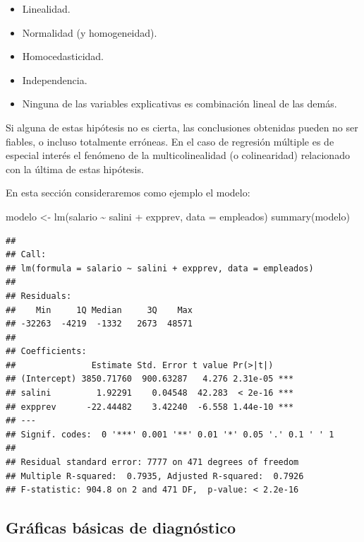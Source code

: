 \documentclass[
]{book}
\newenvironment{Shaded}{\begin{snugshade}}{\end{snugshade}}
\newcommand{\AttributeTok}[1]{\textcolor[rgb]{0.77,0.63,0.00}{#1}}
\newcommand{\FunctionTok}[1]{\textcolor[rgb]{0.00,0.00,0.00}{#1}}
\newcommand{\NormalTok}[1]{#1}
\newcommand{\OtherTok}[1]{\textcolor[rgb]{0.56,0.35,0.01}{#1}}
\newcommand{\SpecialCharTok}[1]{\textcolor[rgb]{0.00,0.00,0.00}{#1}}
\theoremstyle{break}
\begin{document}
\begin{itemize}
\item
  Linealidad.
\item
  Normalidad (y homogeneidad).
\item
  Homocedasticidad.
\item
  Independencia.
\item
  Ninguna de las variables explicativas es combinación lineal de
  las demás.
\end{itemize}

Si alguna de estas hipótesis no es cierta, las conclusiones obtenidas pueden no ser
fiables, o incluso totalmente erróneas. En el caso de regresión múltiple es
de especial interés el fenómeno de la multicolinealidad (o colinearidad)
relacionado con la última de estas hipótesis.

En esta sección consideraremos como ejemplo el modelo:

\begin{Shaded}
\begin{Highlighting}[]
\NormalTok{modelo }\OtherTok{\textless{}{-}} \FunctionTok{lm}\NormalTok{(salario }\SpecialCharTok{\textasciitilde{}}\NormalTok{ salini }\SpecialCharTok{+}\NormalTok{ expprev, }\AttributeTok{data =}\NormalTok{ empleados)}
\FunctionTok{summary}\NormalTok{(modelo)   }
\end{Highlighting}
\end{Shaded}

\begin{verbatim}
## 
## Call:
## lm(formula = salario ~ salini + expprev, data = empleados)
## 
## Residuals:
##    Min     1Q Median     3Q    Max 
## -32263  -4219  -1332   2673  48571 
## 
## Coefficients:
##               Estimate Std. Error t value Pr(>|t|)    
## (Intercept) 3850.71760  900.63287   4.276 2.31e-05 ***
## salini         1.92291    0.04548  42.283  < 2e-16 ***
## expprev      -22.44482    3.42240  -6.558 1.44e-10 ***
## ---
## Signif. codes:  0 '***' 0.001 '**' 0.01 '*' 0.05 '.' 0.1 ' ' 1
## 
## Residual standard error: 7777 on 471 degrees of freedom
## Multiple R-squared:  0.7935, Adjusted R-squared:  0.7926 
## F-statistic: 904.8 on 2 and 471 DF,  p-value: < 2.2e-16
\end{verbatim}

\hypertarget{gruxe1ficas-buxe1sicas-de-diagnuxf3stico}{%
\subsection{Gráficas básicas de diagnóstico}\label{gruxe1ficas-buxe1sicas-de-diagnuxf3stico}}
\end{document}

